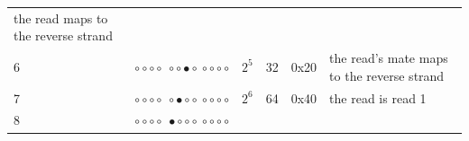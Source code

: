\documentclass[]{krantz}
\begin{document}
\begin{longtable}[]{@{}llllll@{}}
\begin{minipage}[t]{0.35\columnwidth}
the read maps to the reverse
strand\strut
\end{minipage}\tabularnewline
\begin{minipage}[t]{0.09\columnwidth}\raggedright
6\strut
\end{minipage} & \begin{minipage}[t]{0.12\columnwidth}\raggedright
\({\circ}{\circ}{\circ}{\circ}~{\circ}{\circ}{\bullet}{\circ}~{\circ}{\circ}{\circ}{\circ}\)\strut
\end{minipage} & \begin{minipage}[t]{0.12\columnwidth}\raggedright
\(2^5\)\strut
\end{minipage} & \begin{minipage}[t]{0.07\columnwidth}\raggedright
32\strut
\end{minipage} & \begin{minipage}[t]{0.09\columnwidth}\raggedright
0x20\strut
\end{minipage} & \begin{minipage}[t]{0.35\columnwidth}\raggedright
the read's mate maps to the
reverse strand\strut
\end{minipage}\tabularnewline
\begin{minipage}[t]{0.09\columnwidth}\raggedright
7\strut
\end{minipage} & \begin{minipage}[t]{0.12\columnwidth}\raggedright
\({\circ}{\circ}{\circ}{\circ}~{\circ}{\bullet}{\circ}{\circ}~{\circ}{\circ}{\circ}{\circ}\)\strut
\end{minipage} & \begin{minipage}[t]{0.12\columnwidth}\raggedright
\(2^6\)\strut
\end{minipage} & \begin{minipage}[t]{0.07\columnwidth}\raggedright
64\strut
\end{minipage} & \begin{minipage}[t]{0.09\columnwidth}\raggedright
0x40\strut
\end{minipage} & \begin{minipage}[t]{0.35\columnwidth}\raggedright
the read is read 1\strut
\end{minipage}\tabularnewline
\begin{minipage}[t]{0.09\columnwidth}\raggedright
8\strut
\end{minipage} & \begin{minipage}[t]{0.12\columnwidth}\raggedright
\({\circ}{\circ}{\circ}{\circ}~{\bullet}{\circ}{\circ}{\circ}~{\circ}{\circ}{\circ}{\circ}\)\strut

\end{minipage}
\end{longtable}
\end{document}
